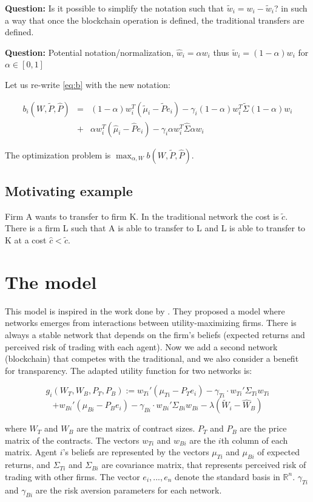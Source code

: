 {\bf Question:} Is it possible to simplify the notation such that $\tilde w_i=w_i-\tilde w_i$? in such a way that once the blockchain operation is defined, the traditional transfers are defined.

{\bf Question:} Potential notation/normalization, $\hat w_i=\alpha w_i$ thus $\tilde w_i=(1-\alpha) w_i$ for $\alpha\in[0,1]$

Let us re-write \ref{eq:b} with the new notation:

\begin{eqnarray}
    b_i(W,\tilde P,\hat P)&=&(1-\alpha) w_i^T(\tilde \mu_i-\tilde Pe_i)-\gamma_i(1-\alpha) w_i^T\tilde \Sigma (1-\alpha) w_i\nonumber\\
            &+&\alpha w_i^T(\hat \mu_i-\hat Pe_i)-\gamma_i\alpha w_i^T\hat \Sigma \alpha w_i\label{eq:b}
\end{eqnarray}

The optimization problem is $\max_{\alpha, W}b(W,\tilde P, \hat P)$.


\subsection{Motivating example}

Firm A wants to transfer to firm K. In the traditional network the cost is $\tilde c$. There is a firm L such that A is able to transfer to L and L is able to transfer to K at a cost $\hat c<\tilde c$.

\section{The model}

This model is inspired in the work done by \cite{jalan_incentive-aware_2024}. They proposed a model where networks emerges from interactions between utility-maximizing firms. There is always a stable network that depends on the firm's beliefs (expected returns and perceived risk of trading with each agent). 
Now we add a second network (blockchain) that competes with the traditional, and we also consider a benefit for transparency. The adapted utility function for two networks is: 

$$ g_i(W_T, W_B, P_T, P_B) := w_{Ti}' (\mu_{Ti} - P_T e_i) - \gamma_{Ti} \cdot w_{Ti}' \Sigma_{Ti} w_{Ti}  $$
$$+ w_{Bi}' (\mu_{Bi} - P_B e_i) - \gamma_{Bi} \cdot w_{Bi}' \Sigma_{Bi} w_{Bi} - \lambda(\tilde W_i - \hat W_B)$$

where $W_T$ and $W_B$ are the matrix of contract sizes. $P_T$ and $P_B$ are the price matrix of the contracts. The vectors $w_{Ti}$ and $w_{Bi}$ are the $i$th column of each matrix. Agent $i$'s beliefs are represented by the vectors $\mu_{Ti}$ and $\mu_{Bi}$ of expected returns, and $\Sigma_{Ti}$ and $\Sigma_{Bi}$ are covariance matrix, that represents perceived risk of trading with other firms. The vector $e_i,...,e_n$ denote the standard basis in $\mathbb{R}^n$. $\gamma_{Ti}$ and $\gamma_{Bi}$ are the risk aversion parameters for each network.
     
